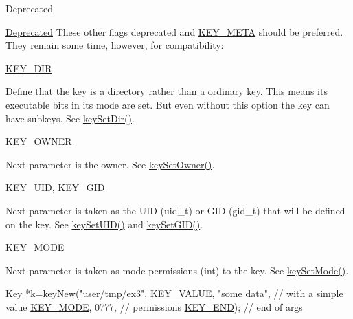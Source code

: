 \begin{DoxyRefDesc}{Deprecated}
\item[\hyperlink{deprecated__deprecated000008}{Deprecated}]These other flags deprecated and \hyperlink{group__key_gga91fb3178848bd682000958089abbaf40a040582834bb2d90049947d7ef74e87e2}{K\-E\-Y\-\_\-\-M\-E\-T\-A} should be preferred. They remain some time, however, for compatibility\-:
\begin{DoxyItemize}
\item \hyperlink{group__key_gga91fb3178848bd682000958089abbaf40a9e43e47c8a21478538e2d20e049981d5}{K\-E\-Y\-\_\-\-D\-I\-R} \par
 Define that the key is a directory rather than a ordinary key. This means its executable bits in its mode are set. But even without this option the key can have subkeys. See \hyperlink{group__meta_gaae575bd86a628a15ee45baa860522e75}{key\-Set\-Dir()}.
\item \hyperlink{group__key_gga91fb3178848bd682000958089abbaf40a77ca60362fa8daca8d5347db4385068b}{K\-E\-Y\-\_\-\-O\-W\-N\-E\-R} \par
 Next parameter is the owner. See \hyperlink{group__meta_ga88d6ec200ba0707b7c1b4a88133d2be4}{key\-Set\-Owner()}.
\item \hyperlink{group__key_gga91fb3178848bd682000958089abbaf40a28f01a87d65f065172f734c9c9446c0e}{K\-E\-Y\-\_\-\-U\-I\-D}, \hyperlink{group__key_gga91fb3178848bd682000958089abbaf40ac0628bbaba7c837ca73323681393d15f}{K\-E\-Y\-\_\-\-G\-I\-D} \par
 Next parameter is taken as the U\-I\-D (uid\-\_\-t) or G\-I\-D (gid\-\_\-t) that will be defined on the key. See \hyperlink{group__meta_gab5f284f5ecd261e0a290095f50ba1af7}{key\-Set\-U\-I\-D()} and \hyperlink{group__meta_ga9e3d0fb3f7ba906e067727b9155d22e3}{key\-Set\-G\-I\-D()}.
\item \hyperlink{group__key_gga91fb3178848bd682000958089abbaf40a1b0a91ff3a855d6993930ebf0abaa518}{K\-E\-Y\-\_\-\-M\-O\-D\-E} \par
 Next parameter is taken as mode permissions (int) to the key. See \hyperlink{group__meta_ga8803037e35b9da1ce492323a88ff6bc3}{key\-Set\-Mode()}. 
\begin{DoxyCodeInclude}
\hyperlink{classkdb_1_1Key_a5679f5cae63caddd64a60388b9cc77fa}{Key} *k=\hyperlink{group__key_gad23c65b44bf48d773759e1f9a4d43b89}{keyNew}(\textcolor{stringliteral}{"user/tmp/ex3"},
        \hyperlink{group__key_gga91fb3178848bd682000958089abbaf40ac66e4a49d09212b79f5754ca6db5bd2e}{KEY\_VALUE}, \textcolor{stringliteral}{"some data"},    \textcolor{comment}{// with a simple value}
        \hyperlink{group__key_gga91fb3178848bd682000958089abbaf40a1b0a91ff3a855d6993930ebf0abaa518}{KEY\_MODE}, 0777,            \textcolor{comment}{// permissions}
        \hyperlink{group__key_gga91fb3178848bd682000958089abbaf40aa8adb6fcb92dec58fb19410eacfdd403}{KEY\_END});                  \textcolor{comment}{// end of args}
\end{DoxyCodeInclude}


\end{DoxyItemize}
\end{DoxyRefDesc}
